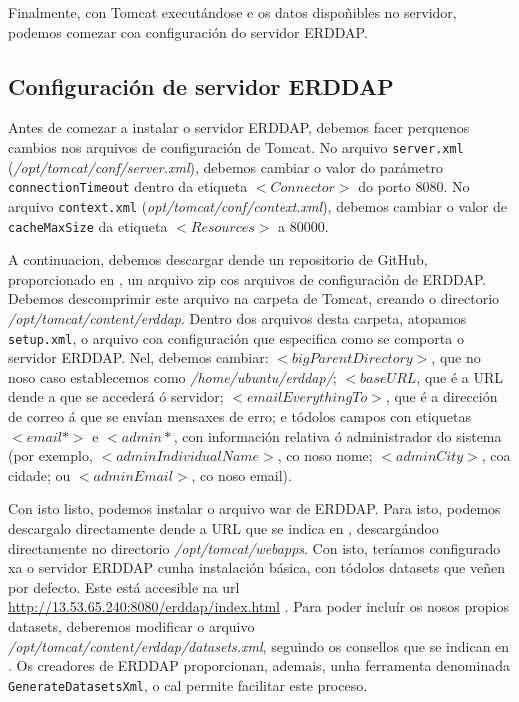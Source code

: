 Finalmente, con Tomcat executándose e os datos dispoñibles no servidor, podemos comezar coa configuración do servidor ERDDAP.


\subsection{Configuración de servidor ERDDAP}\label{erddapconf}
Antes de comezar a instalar o servidor ERDDAP, debemos facer perquenos cambios nos arquivos de configuración de Tomcat. No arquivo \texttt{server.xml} (\textit{/opt/tomcat/conf/server.xml}),
debemos cambiar o valor do parámetro \texttt{connectionTimeout} dentro da etiqueta $<Connector>$ do porto 8080. No arquivo \texttt{context.xml} (\textit{opt/tomcat/conf/context.xml}), debemos
cambiar o valor de \texttt{cacheMaxSize} da etiqueta $<Resources>$ a 80000.

A continuacion, debemos descargar dende un repositorio de GitHub, proporcionado en \cite{erddapsetup}, un arquivo zip cos arquivos de configuración de ERDDAP. Debemos descomprimir este arquivo na 
carpeta de Tomcat, creando o directorio \textit{/opt/tomcat/content/erddap}. Dentro dos arquivos desta carpeta, atopamos \texttt{setup.xml}, o arquivo coa configuración que especifica como se
comporta o servidor ERDDAP. Nel, debemos cambiar: $<bigParentDirectory>$, que no noso caso establecemos como \textit{/home/ubuntu/erddap/}; $<baseURL$, que é a URL dende a que se accederá ó servidor;
$<emailEverythingTo>$, que é a dirección de correo á que se envían mensaxes de erro; e tódolos campos con etiquetas $<email*>$ e $<admin*$, con información relativa ó administrador do sistema (por
exemplo, $<adminIndividualName>$, co noso nome; $<adminCity>$, coa cidade; ou $<adminEmail>$, co noso email).

Con isto listo, podemos instalar o arquivo war de ERDDAP. Para isto, podemos descargalo directamente dende a URL que se indica en \cite{erddapsetup}, descargándoo directamente no directorio \textit{/opt/tomcat/webapps}.
Con isto, teríamos configurado xa o servidor ERDDAP cunha instalación básica, con tódolos datasets que veñen por defecto. Este está accesible na url \url{http://13.53.65.240:8080/erddap/index.html} .
Para poder incluír os nosos propios datasets, deberemos modificar o arquivo \textit{/opt/tomcat/content/erddap/datasets.xml}, seguindo os consellos que se indican en \cite{erddapdatasets}. Os
creadores de ERDDAP proporcionan, ademais, unha ferramenta denominada \texttt{GenerateDatasetsXml}, o cal permite facilitar este proceso.

